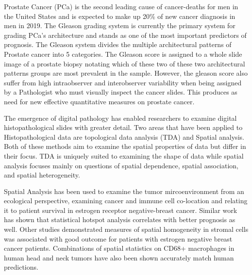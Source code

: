     Prostate Cancer (PCa) is the second leading cause of cancer-deaths for men in the United States and is expected to make
    up 20\% of new cancer diagnosis in men in 2019\cite{siegel2019cancer}.
    The Gleason grading system is currently the primary system for grading PCa's architecture and stands as one of the
        most important predictors of prognosis.
    The Gleason system divides the multiple architectural patterns of Prostate cancer into 5 categories.
    The Gleason score is assigned to a whole slide image of a prostate biopsy notating which of these two of these two
        architectural patterns groups are most prevalent in the sample.
    However, the gleason score also suffer from high intraobserver and interobserver variability when being assigned by
    a Pathologist who must visually inspect the cancer slides.\cite{walsh2013gleason}
    This produces as need for new effective quantitative measures on prostate cancer.

    The emergence of digital pathology has enabled researchers to examine digital histopathological slides with greater
        detail.
    Two areas that have been applied to Histopathological data are topological data analysis (TDA) and Spatial analysis.
    Both of these methods aim to examine the spatial properties of data but differ in their focus.
    TDA is uniquely suited to examining the shape of data while spatial analysis focuses mainly on questions of
    spatial dependence, spatial association, and spatial heterogeneity.\cite{de_smith_geospatial_2018}


    Spatial Analysis has been used to examine the tumor mircoenvironment from an ecological perspective, examining cancer
        and immune cell co-location and relating it to patient survival in estrogen receptor negative-breast cancer.
    Similar work has shown that statistical hotspot analysis correlates with better prognosis as well.
    Other studies demonstrated measures of spatial homogeneity in stromal cells was associated with good outcome for
        patients with estrogen negative breast cancer patients.
    Combinations of spatial statistics on CD68+ macrophages in human head and neck tumors have also been shown
        accurately match human predictions. %

